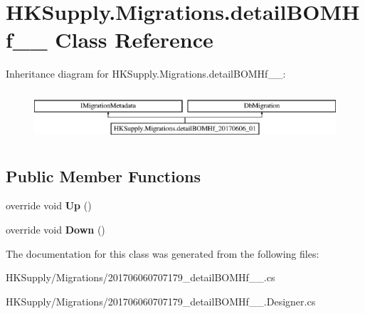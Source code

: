 \hypertarget{class_h_k_supply_1_1_migrations_1_1detail_b_o_m_hf__20170606__01}{}\section{H\+K\+Supply.\+Migrations.\+detail\+B\+O\+M\+Hf\+\_\+\_ Class Reference}
\label{class_h_k_supply_1_1_migrations_1_1detail_b_o_m_hf__20170606__01}
Inheritance diagram for H\+K\+Supply.\+Migrations.\+detail\+B\+O\+M\+Hf\+\_\+\_\+:\begin{figure}[H]
\begin{center}
\leavevmode
\includegraphics[height=1.872910cm]{class_h_k_supply_1_1_migrations_1_1detail_b_o_m_hf__20170606__01}
\end{center}
\end{figure}
\subsection*{Public Member Functions}
\begin{DoxyCompactItemize}
\item 
\mbox{\label{class_h_k_supply_1_1_migrations_1_1detail_b_o_m_hf__20170606__01_aac864d26e9a6e459bc9656ac8ce75e4e}} 
override void {\bfseries Up} ()
\item 
\mbox{\label{class_h_k_supply_1_1_migrations_1_1detail_b_o_m_hf__20170606__01_ad1567eeae5d1407490cb796e6f3fef62}} 
override void {\bfseries Down} ()
\end{DoxyCompactItemize}


The documentation for this class was generated from the following files\+:\begin{DoxyCompactItemize}
\item 
H\+K\+Supply/\+Migrations/201706060707179\+\_\+detail\+B\+O\+M\+Hf\+\_\+\_.\+cs\item 
H\+K\+Supply/\+Migrations/201706060707179\+\_\+detail\+B\+O\+M\+Hf\+\_\+\_.\+Designer.\+cs\end{DoxyCompactItemize}

